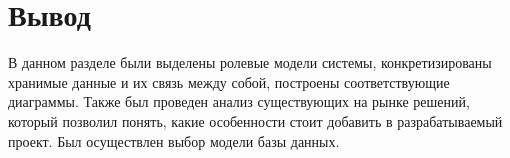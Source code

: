 \section*{Вывод}

В данном разделе были выделены ролевые модели системы, конкретизированы хранимые данные и их связь между собой, построены соответствующие диаграммы. Также был проведен анализ существующих на рынке решений, который позволил понять, какие особенности стоит добавить в разрабатываемый проект. Был осуществлен выбор модели базы данных.